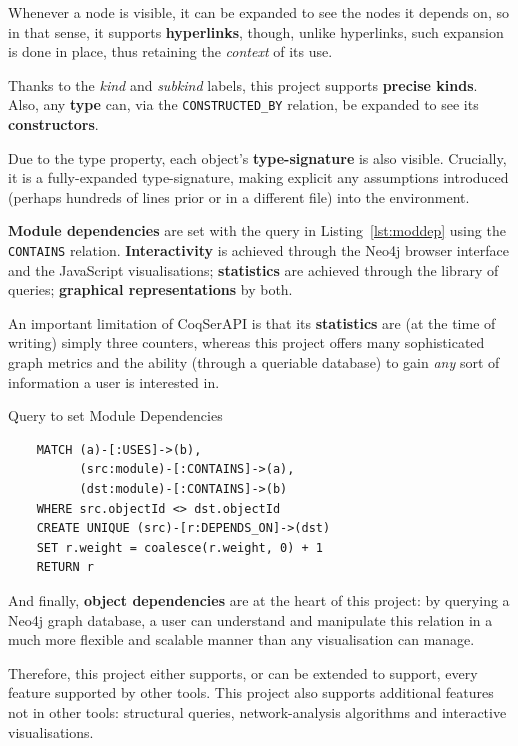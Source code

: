 Whenever a node is visible, it can be expanded to see the nodes it depends on,
so in that sense, it supports \textbf{hyperlinks}, though, unlike hyperlinks,
such expansion is done in place, thus retaining the \emph{context} of its use.

Thanks to the \emph{kind} and \emph{subkind} labels, this project supports
\textbf{precise kinds}.  Also, any \textbf{type} can, via the
\texttt{CONSTRUCTED\_BY} relation, be expanded to see its \textbf{constructors}.

Due to the type property, each object's \textbf{type-signature} is also visible.
Crucially, it is a fully-expanded type-signature, making explicit any
assumptions introduced (perhaps hundreds of lines prior or in a different file)
into the environment.

\textbf{Module dependencies} are set with the query in Listing~\ref{lst:moddep}
using the \texttt{CONTAINS} relation. \textbf{Interactivity} is achieved through
the Neo4j browser interface and the JavaScript visualisations;
\textbf{statistics} are achieved through the library of queries;
\textbf{graphical representations} by both.

An important limitation of CoqSerAPI is that its \textbf{statistics} are (at
the time of writing) simply three counters, whereas this project offers many
sophisticated graph metrics and the ability (through a queriable database) to
gain \emph{any} sort of information a user is interested in.

\begin{listing}[tp]%

\caption{Query to set Module Dependencies}\label{lst:moddep}

  \begin{verbatim}
    MATCH (a)-[:USES]->(b),
          (src:module)-[:CONTAINS]->(a),
          (dst:module)-[:CONTAINS]->(b)
    WHERE src.objectId <> dst.objectId
    CREATE UNIQUE (src)-[r:DEPENDS_ON]->(dst)
    SET r.weight = coalesce(r.weight, 0) + 1
    RETURN r
  \end{verbatim}

\end{listing}

And finally, \textbf{object dependencies} are at the heart of this project: by
querying a Neo4j graph database, a user can understand and manipulate this
relation in a much more flexible and scalable manner than any visualisation can
manage.

Therefore, this project either supports, or can be extended to support, every
feature supported by other tools.  This project also supports additional
features not in other tools: structural queries, network-analysis algorithms and
interactive visualisations.

